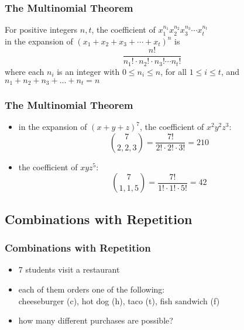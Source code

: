 \documentclass[dvipsnames]{beamer}
\begin{document}
\begin{frame}
  \frametitle{The Multinomial Theorem}

  \begin{theorem}
    For positive integers $n, t$, the coefficient of
    $x_{1}^{n_1} x_{2}^{n_2} x_{3}^{n_3} \cdots x_{t}^{n_t}$\\
    in the expansion of $(x_1 + x_2 + x_3 + \cdots + x_t)^n$ is
    \begin{equation*}
      \frac{n!}{n_1! \cdot n_2! \cdot n_3! \cdots n_t!}
    \end{equation*}
    where each $n_i$ is an integer with $0 \leq n_i \leq n$,
    for all $1 \leq i \leq t$, and\\
    $n_1 + n_2 + n_3 + ... + n_t = n$
  \end{theorem}
\end{frame}

\begin{frame}
  \frametitle{The Multinomial Theorem}

  \begin{example}
    \begin{itemize}
      \item in the expansion of $(x+y+z)^7$, the coefficient of $x^2 y^2 z^3$:
      \begin{equation*}
        {7 \choose 2,2,3} = \frac{7!}{2! \cdot 2! \cdot 3!} = 210
      \end{equation*}
    \end{itemize}
    \begin{itemize}
      \item the coefficient of $x y z^5$:
      \begin{equation*}
        {7 \choose 1,1,5} = \frac{7!}{1! \cdot 1! \cdot 5!} = 42
      \end{equation*}
    \end{itemize}
  \end{example}
\end{frame}

\subsection{Combinations with Repetition}

\begin{frame}
  \frametitle{Combinations with Repetition}

  \begin{example}
    \begin{itemize}
      \item 7 students visit a restaurant
      \item each of them orders one of the following:\\
        cheeseburger (c), hot dog (h), taco (t), fish sandwich (f)
      \item how many different purchases are possible?
    \end{itemize}
  \end{example}
\end{frame}
\end{document}
